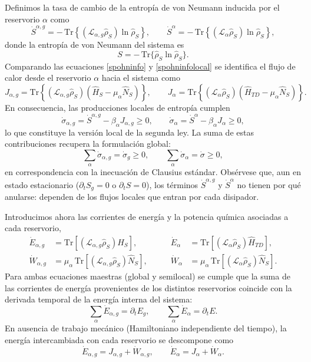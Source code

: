 Definimos la tasa de cambio de la entropía de von Neumann inducida por el reservorio $\alpha$ como
\[
\dot{S}^{\alpha,g}
= -\,\mathrm{Tr}\!\left\{(\mathcal{L}_{\alpha,g}\hat{\rho}_{S})\ln\hat{\rho}_{S}\right\},
\qquad
\dot{S}^{\alpha}
= -\,\mathrm{Tr}\!\left\{(\mathcal{L}_{\alpha}\hat{\rho}_{S})\ln\hat{\rho}_{S}\right\},
\]
donde la entropía de von Neumann del sistema es
\[
S=-\,\mathrm{Tr}\{\hat{\rho}_{S}\ln\hat{\rho}_{S}\}.
\]
Comparando las ecuaciones \eqref{spohninfo} y \eqref{spohninfolocal} se identifica el flujo de calor desde el reservorio $\alpha$ hacia el sistema como
\[
J_{\alpha,g}
=\mathrm{Tr}\!\left\{(\mathcal{L}_{\alpha,g}\hat{\rho}_{S})
(\hat{H}_{S}-\mu_{\alpha}\hat{N}_{S})\right\},
\qquad
J_{\alpha}
=\mathrm{Tr}\!\left\{(\mathcal{L}_{\alpha}\hat{\rho}_{S})
(\hat{H}_{TD}-\mu_{\alpha}\hat{N}_{S})\right\}.
\]
En consecuencia, las producciones locales de entropía cumplen
\begin{equation}
    \dot{\sigma}_{\alpha,g}=\dot{S}^{\alpha,g}-\beta_{\alpha}J_{\alpha,g}\ge 0,
    \qquad
    \dot{\sigma}_{\alpha}=\dot{S}^{\alpha}-\beta_{\alpha}J_{\alpha}\ge 0,
    \label{sec4:localentropy}
\end{equation}
lo que constituye la versión local de la segunda ley. La suma de estas contribuciones recupera la formulación global:
\[
\sum_{\alpha}\dot{\sigma}_{\alpha,g}
=\dot{\sigma}_{g}\ge 0,
\qquad
\sum_{\alpha}\dot{\sigma}_{\alpha}
=\dot{\sigma}\ge 0,
\]
en correspondencia con la inecuación de Clausius estándar. Obsérvese que, aun en estado estacionario
($\partial_{t}S_{g}=0$ o $\partial_{t}S=0$), los términos
$\dot{S}^{\alpha,g}$ y $\dot{S}^{\alpha}$ no tienen por qué anularse: dependen de los flujos locales que entran por cada disipador.

Introducimos ahora las corrientes de energía y la potencia química asociadas a cada reservorio,
\begin{align*}
    \dot{E}_{\alpha,g}
    &= \mathrm{Tr}\!\left[(\mathcal{L}_{\alpha,g}\hat{\rho}_{S})\hat{H}_{S}\right],
    &\qquad
    \dot{E}_{\alpha}
    &= \mathrm{Tr}\!\left[(\mathcal{L}_{\alpha}\hat{\rho}_{S})\hat{H}_{TD}\right],\\[2pt]
    \dot{W}_{\alpha,g}
    &= \mu_{\alpha}\,\mathrm{Tr}\!\left[(\mathcal{L}_{\alpha,g}\hat{\rho}_{S})\hat{N}_{S}\right],
    &\qquad
    \dot{W}_{\alpha}
    &= \mu_{\alpha}\,\mathrm{Tr}\!\left[(\mathcal{L}_{\alpha}\hat{\rho}_{S})\hat{N}_{S}\right].
\end{align*}
Para ambas ecuaciones maestras (global y semilocal) se cumple que la suma de las corrientes de energía provenientes de los distintos reservorios coincide con la derivada temporal de la energía interna del sistema:
\[
\sum_{\alpha}\dot{E}_{\alpha,g}=\partial_{t}E_{g},
\qquad
\sum_{\alpha}\dot{E}_{\alpha}=\partial_{t}E.
\]
En ausencia de trabajo mecánico (Hamiltoniano independiente del tiempo), la energía intercambiada con cada reservorio se descompone como
\[
\dot{E}_{\alpha,g}=J_{\alpha,g}+\dot{W}_{\alpha,g},
\qquad
\dot{E}_{\alpha}=J_{\alpha}+\dot{W}_{\alpha}.
\]

